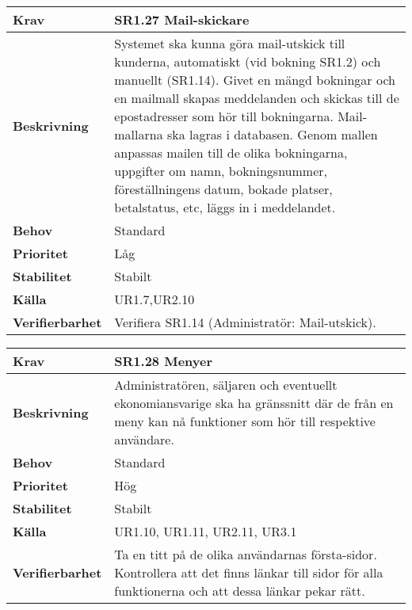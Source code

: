 \documentclass[a4paper, twoside, 11pt, titlepage]{article}
\begin{document}
		\begin {table} [ht] \begin{tabular} { p{2.6cm} p{12.5cm} }
			\hline
			\sffamily\textbf{Krav} & \sffamily\textbf{SR1.27 Mail-skickare } \\
			\hline
			\sffamily\textbf{Beskrivning} & Systemet ska kunna göra mail-utskick till kunderna, automatiskt (vid bokning SR1.2) och manuellt (SR1.14). Givet en mängd bokningar och en mailmall skapas meddelanden och skickas till de epostadresser som hör till bokningarna. Mail-mallarna ska lagras i databasen. Genom mallen anpassas mailen till de olika bokningarna, uppgifter om namn, bokningsnummer, föreställningens datum, bokade platser, betalstatus, etc, läggs in i meddelandet.  \\
			\hline
			\sffamily\textbf{Behov} & Standard  \\
			\hline
			\sffamily\textbf{Prioritet} & Låg  \\
			\hline
			\sffamily\textbf{Stabilitet} & Stabilt  \\
			\hline
			\sffamily\textbf{Källa} & UR1.7,UR2.10  \\
			\hline
			\sffamily\textbf{Verifierbarhet} & Verifiera SR1.14 (Administratör: Mail-utskick).  \\
			\hline
		\end{tabular} \end{table} \FloatBarrier
		\vspace{6mm}

		\begin {table} [ht] \begin{tabular} { p{2.6cm} p{12.5cm} }
			\hline
			\sffamily\textbf{Krav} & \sffamily\textbf{SR1.28 Menyer } \\
			\hline
			\sffamily\textbf{Beskrivning} & Administratören, säljaren och eventuellt ekonomiansvarige ska ha gränssnitt där de från en meny kan nå funktioner som hör till respektive användare.  \\
			\hline
			\sffamily\textbf{Behov} & Standard  \\
			\hline
			\sffamily\textbf{Prioritet} & Hög  \\
			\hline
			\sffamily\textbf{Stabilitet} & Stabilt  \\
			\hline
			\sffamily\textbf{Källa} & UR1.10, UR1.11, UR2.11, UR3.1  \\
			\hline
			\sffamily\textbf{Verifierbarhet} & Ta en titt på de olika användarnas första-sidor. Kontrollera att det finns länkar till sidor för alla funktionerna och att dessa länkar pekar rätt.  \\
			\hline
		\end{tabular} \end{table} \FloatBarrier
		\vspace{6mm}
\end{document}
